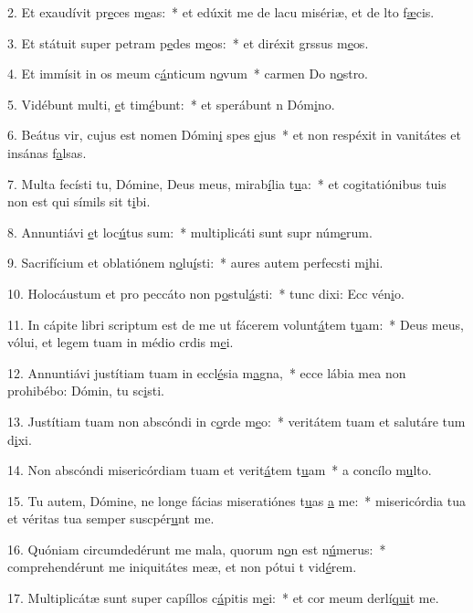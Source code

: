 2. Et exaudívit pr\uline{e}ces m\uline{e}as:~* et edúxit me de lacu misériæ, et de lto f\uline{æ}cis.\par 
3. Et státuit super petram p\uline{e}des m\uline{e}os:~* et diréxit grssus m\uline{e}os.\par 
4. Et immísit in os meum c\uline{á}nticum n\uline{o}vum~* carmen Do n\uline{o}stro.\par 
5. Vidébunt multi, \uline{e}t tim\uline{é}bunt:~* et sperábunt n Dóm\uline{i}no.\par 
6. Beátus vir, cujus est nomen Dómin\uline{i} spes \uline{e}jus~* et non respéxit in vanitátes et insánas f\uline{a}lsas.\par 
7. Multa fecísti tu, Dómine, Deus meus, mirab\uline{í}lia t\uline{u}a:~* et cogitatiónibus tuis non est qui símils sit t\uline{i}bi.\par 
8. Annuntiávi \uline{e}t loc\uline{ú}tus sum:~* multiplicáti sunt supr núm\uline{e}rum.\par 
9. Sacrifícium et oblatiónem n\uline{o}lu\uline{í}sti:~* aures autem perfecsti m\uline{i}hi.\par 
10. Holocáustum et pro peccáto non p\uline{o}stul\uline{á}sti:~* tunc dixi: Ecc vén\uline{i}o.\par 
11. In cápite libri scriptum est de me ut fácerem volunt\uline{á}tem t\uline{u}am:~* Deus meus, vólui, et legem tuam in médio crdis m\uline{e}i.\par 
12. Annuntiávi justítiam tuam in eccl\uline{é}sia m\uline{a}gna,~* ecce lábia mea non prohibébo: Dómin, tu sc\uline{i}sti.\par 
13. Justítiam tuam non abscóndi in c\uline{o}rde m\uline{e}o:~* veritátem tuam et salutáre tum d\uline{i}xi.\par 
14. Non abscóndi misericórdiam tuam et verit\uline{á}tem t\uline{u}am~* a concílo m\uline{u}lto.\par 
15. Tu autem, Dómine, ne longe fácias miseratiónes t\uline{u}as \uline{a} me:~* misericórdia tua et véritas tua semper suscpér\uline{u}nt me.\par 
16. Quóniam circumdedérunt me mala, quorum n\uline{o}n est n\uline{ú}merus:~* comprehendérunt me iniquitátes meæ, et non pótui t vid\uline{é}rem.\par 
17. Multiplicátæ sunt super capíllos c\uline{á}pitis m\uline{e}i:~* et cor meum derlí\uline{qui}t me.\par 
